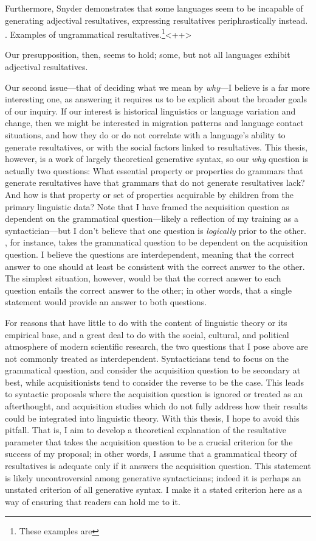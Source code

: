 \documentclass[MilwayThesis]{subfiles}
\begin{document}
Furthermore, Snyder demonstrates that some languages seem to be incapable of generating adjectival resultatives, expressing resultatives periphrastically instead.
\ex. Examples of ungrammatical resultatives.\footnote{These examples are }<++>

Our presupposition, then, seems to hold; some, but not all languages exhibit adjectival resultatives.

Our second issue---that of deciding what we mean by \textit{why}---I believe is a far more interesting one, as answering it requires us to be explicit about the broader goals of our inquiry.
If our interest is historical linguistics or language variation and change, then we might be interested in migration patterns and language contact situations, and how they do or do not correlate with a language's ability to generate resultatives, or with the social factors linked to resultatives.
This thesis, however, is a work of largely theoretical generative syntax, so our \textit{why} question is actually two questions: What essential property or properties do grammars that generate resultatives have that grammars that do not generate resultatives lack? And how is that property or set of properties acquirable by children from the primary linguistic data?
Note that I have framed the acquisition question as dependent on the grammatical question---likely a reflection of my training as a syntactician---but I don't believe that one question is \textit{logically} prior to the other.
\textcite{snyder1995language,snyder2001nature}, for instance, takes the grammatical question to be dependent on the acquisition question.
I believe the questions are interdependent, meaning that the correct answer to one should at least be consistent with the correct answer to the other.
The simplest situation, however, would be that the correct answer to each question entails the correct answer to the other; in other words, that a single statement would provide an answer to both questions.

For reasons that have little to do with the content of linguistic theory or its empirical base, and a great deal to do with the social, cultural, and political atmosphere of modern scientific research, the two questions that I pose above are not commonly treated as interdependent.
Syntacticians tend to focus on the grammatical question, and consider the acquisition question to be secondary at best, while acquisitionists tend to consider the reverse to be the case.
This leads to syntactic proposals where the acquisition question is ignored or treated as an afterthought, and acquisition studies which do not fully address how their results could be integrated into linguistic theory.
With this thesis, I hope to avoid this pitfall.
That is, I aim to develop a theoretical explanation of the resultative parameter that takes the acquisition question to be a crucial criterion for the success of my proposal; in other words, I assume that a grammatical theory of resultatives is adequate only if it answers the acquisition question.
This statement is likely uncontroversial among generative syntacticians; indeed it is perhaps an unstated criterion of all generative syntax.
I make it a stated criterion here as a way of ensuring that readers can hold me to it.
\end{document}
